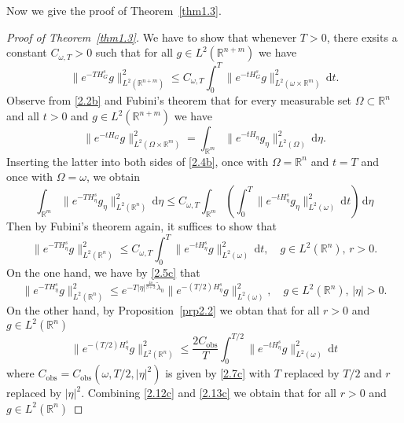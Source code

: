 \documentclass{article}
\numberwithin{equation}{section}
\renewcommand{\d}{\,\mathrm{d}}
\newcommand\R{\ensuremath{\mathbb{R}}}
\numberwithin{equation}{section}
\theoremstyle{definition}
\begin{document}
Now we give the proof of Theorem~\ref{thm1.3}.
\begin{proof}[Proof of Theorem~\ref{thm1.3}]
We have to show that whenever $T>0$, there exsits a constant $C_{\omega,T}>0$ such that for all $g\in L^2(\R^{n+m})$ we have
\begin{equation}\label{2.4b}
	\|e^{-TH_{G}^{s}}g\|^2_{L^2\left( \R^{n+m} \right) }\le C_{\omega,T}\int_0^{T}\|e^{-tH_{G}^{s}}g\|^2_{L^2\left( \omega\times \R^{m} \right) }\d t.
\end{equation}
Observe from \eqref{2.2b} and Fubini's theorem that for every measurable set $\Omega \subset \R^{n}$ and all $t>0$ and $g \in L^2\left( \R^{n+m} \right) $ we have
\begin{equation*}
	\|e^{-tH_{G}}g\|^2_{L^2(\Omega\times \R^{m})}=\int_{\R^{m}}\|e^{-tH_{\eta}}g_\eta\|^2_{L^2(\Omega)}\d \eta.
\end{equation*}
Inserting the latter into both sides of \eqref{2.4b}, once with $\Omega=\R^{n}$ and $t=T$ and once with  $\Omega=\omega$, we obtain
\begin{equation*}
	\int_{\R^{m}}\|e^{-TH_{\eta}^{s}}g_{\eta}\|^2_{L^2\left( \R^{n} \right) } \d \eta\le C_{\omega,T} \int_{\R^{m}}\left( \int_{0}^{T}\|e^{-tH_{\eta}^{s}}g_\eta\|^2_{L^2(\omega)}\d t \right)\d \eta 
\end{equation*}
Then by Fubini's theorem again, it suffices to show that
\begin{equation*}
	\|e^{-TH_{\eta}^{s} }g\|^2_{L^2(\R^{n})}\le C_{\omega,T}\int_0^{T}\|e^{-tH_{\eta}^{s}}g\|^2_{L^2(\omega)}\d t,\quad  g\in L^2(\R^{n}),\,r>0.
\end{equation*}
On the one hand, we have by \eqref{2.5c} that
\begin{equation}\label{2.12c}
	\|e^{-TH_{\eta}^{s}}g\|^2_{L^2(\R^{n})}\le e^{-T|\eta|^{\frac{4s}{\beta+2}}\widetilde{\lambda}_0}\|e^{-(T /2)H_{\eta}^{s}}g\|^2_{L^2(\omega)}, \quad  g\in L^2(\R^{n}),\,|\eta|>0.
\end{equation}
On the other hand, by Proposition~\ref{prp2.2} we obtan that for all $r> 0$ and $g\in L^2(\R^{n})$
\begin{equation}\label{2.13c}
	\|e^{-(T /2)H_{\eta}^{s}}g\|^2_{L^2(\R^{n})}\le \frac{2 C_{\mathrm{obs}}}{T}\int_0^{T /2} \|e^{-tH_{\eta}^{s}}g\|^2_{L^2(\omega)}\d t
\end{equation}
where $C_{\mathrm{obs}}=C_{\mathrm{obs}}(\omega,T /2,|\eta|^2)$ is given by \eqref{2.7c} with $T$ replaced by $T /2$ and $r$ replaced by $|\eta|^2$. Combining \eqref{2.12c} and \eqref{2.13c} we obtain that for all $r>0$ and $g\in L^2(\R^{n})$ 

\end{proof}
\end{document}
